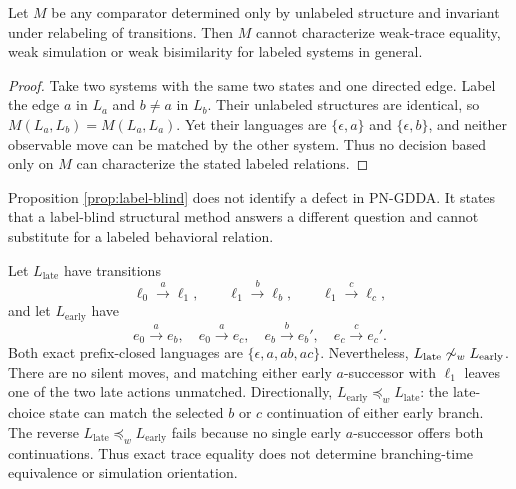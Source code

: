 \documentclass{ws-jbcb}
\numberwithin{equation}{section}
\newcommand{\weaksim}{\mathrel{\sim_{w}}}
\newcommand{\weakpre}{\mathrel{\preceq_{w}}}
\begin{document}
\begin{proposition}
\label{prop:label-blind}
Let $M$ be any comparator determined only by unlabeled structure and invariant
under relabeling of transitions. Then $M$ cannot characterize weak-trace
equality, weak simulation or weak bisimilarity for labeled systems in general.
\end{proposition}

\begin{proof}
Take two systems with the same two states and one directed edge. Label the edge
$a$ in $L_a$ and $b\neq a$ in $L_b$. Their unlabeled structures are identical,
so $M(L_a,L_b)=M(L_a,L_a)$. Yet their languages are
$\{\epsilon,a\}$ and $\{\epsilon,b\}$, and neither observable move can be
matched by the other system. Thus no decision based only on $M$ can characterize
the stated labeled relations.
\end{proof}

Proposition \ref{prop:label-blind} does not identify a defect in PN-GDDA. It
states that a label-blind structural method answers a different question and
cannot substitute for a labeled behavioral relation.

\begin{example}\label{ex:branching}
Let $L_{\mathrm{late}}$ have transitions
\begin{equation}\label{eq:late-choice}
 \ell_0\xrightarrow{a}\ell_1,\qquad
 \ell_1\xrightarrow{b}\ell_b,\qquad
 \ell_1\xrightarrow{c}\ell_c,
\end{equation}
and let $L_{\mathrm{early}}$ have
\begin{equation}\label{eq:early-choice}
 e_0\xrightarrow{a}e_b,\quad e_0\xrightarrow{a}e_c,\quad
 e_b\xrightarrow{b}e_b',\quad e_c\xrightarrow{c}e_c'.
\end{equation}
Both exact prefix-closed languages are
$\{\epsilon,a,ab,ac\}$. Nevertheless,
$L_{\mathrm{late}}\not\weaksim L_{\mathrm{early}}$. There are no silent moves,
and matching either early $a$-successor with $\ell_1$ leaves one of the two
late actions unmatched. Directionally,
$L_{\mathrm{early}}\weakpre L_{\mathrm{late}}$: the late-choice state can match
the selected $b$ or $c$ continuation of either early branch. The reverse
$L_{\mathrm{late}}\weakpre L_{\mathrm{early}}$ fails because no single early
$a$-successor offers both continuations. Thus exact trace equality does not
determine branching-time equivalence or simulation orientation.
\end{example}
\end{document}
